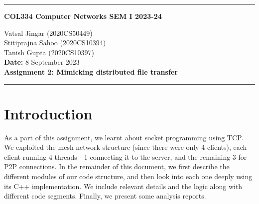 \documentclass[12pt]{scrartcl}
\begin{document}
\onehalfspacing
\newcommand{\current}{June 2023}
\begin{center}
\hrule
\vspace{.4cm}
{\textbf { \large COL334 Computer Networks SEM I 2023-24}}
\end{center}
{
    \begin{center}
        Vatsal Jingar (2020CS50449)\\ Stitiprajna Sahoo (2020CS10394)\\ Tanish Gupta (2020CS10397)\\
        \textbf{Date:} 8 September 2023 \\
        \textbf{Assignment 2: Mimicking distributed file transfer}
    
    \end{center}
{ 
    \hrule
}
}

\section{Introduction}

As a part of this assignment, we learnt about socket programming using TCP. We exploited the mesh network structure (since there were only 4 clients), each client running 4 threads - 1 connecting it to the server, and the remaining 3 for P2P connections. In the remainder of this document, we first describe the different modules of our code structure, and then look into each one deeply using its C++ implementation. We include relevant details and the logic along with different code segments. Finally, we present some analysis reports.
\end{document}
